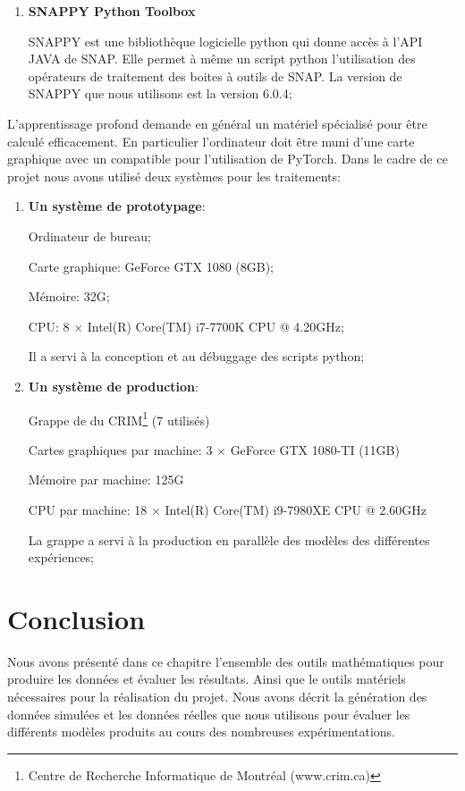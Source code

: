 \begin{enumerate}
    \item \textbf{SNAPPY Python Toolbox}
    
    SNAPPY est une bibliothèque logicielle python qui donne accès à l'API JAVA de SNAP.  Elle permet à même un script python l'utilisation des opérateurs de traitement des boites à outils de SNAP. La version de SNAPPY que nous utilisons est la version 6.0.4;
    
\end{enumerate}

L'apprentissage profond demande en général un matériel spécialisé pour être calculé efficacement.  En particulier l'ordinateur doit être muni d'une carte graphique avec un \acrgpu compatible pour l'utilisation de PyTorch.  Dans le cadre de ce projet nous avons utilisé deux systèmes pour les traitements:

\begin{enumerate}
    \item \textbf{Un système de prototypage}:
    
    Ordinateur de bureau;
    
    Carte graphique: GeForce GTX 1080 (8GB);
    
    Mémoire: 32G;
    
    CPU: 8 $\times$ Intel(R) Core(TM) i7-7700K CPU @ 4.20GHz;
    
       Il a servi à la conception et au débuggage des scripts python;

    \item \textbf{Un système de production}:
    
    Grappe de \acrgpu du CRIM\footnote{Centre de Recherche Informatique de Montréal (www.crim.ca)} (7 \acrgpu utilisés)
    
    Cartes graphiques par machine: 3 $\times$ GeForce GTX 1080-TI (11GB)
    
    Mémoire par machine: 125G
    
    CPU par machine: 18  $\times$ Intel(R) Core(TM) i9-7980XE CPU @ 2.60GHz
    
    La grappe a servi à la production en parallèle des modèles des différentes expériences;
    
\end{enumerate}

\section{Conclusion}

Nous avons présenté dans ce chapitre l'ensemble des outils mathématiques pour produire les données et évaluer les résultats.  Ainsi que le outils matériels nécessaires pour la réalisation du projet. Nous avons décrit la génération des données simulées et les données réelles que nous utilisons pour évaluer les différents modèles produits au cours des nombreuses expérimentations.